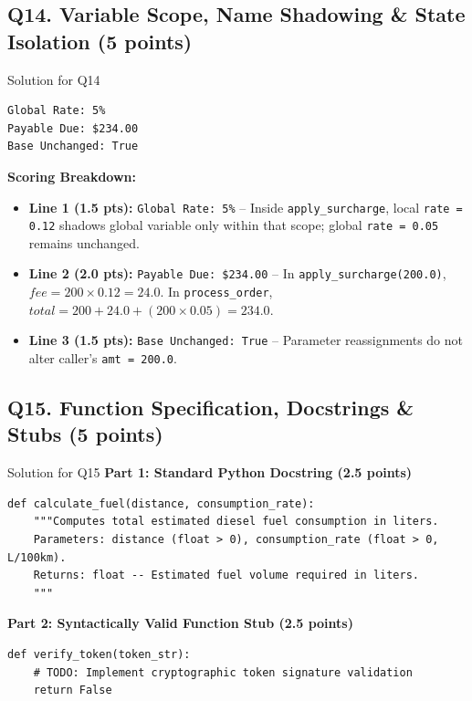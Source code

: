 \documentclass[11pt,a4paper]{article}
\begin{document}
\vspace{0.15cm}

\subsection*{Q14. Variable Scope, Name Shadowing \& State Isolation (5 points)}
\begin{solbox}{Solution for Q14}
\begin{lstlisting}
Global Rate: 5%
Payable Due: $234.00
Base Unchanged: True
\end{lstlisting}
\small
\textbf{Scoring Breakdown:}
\begin{itemize}[leftmargin=2em, itemsep=1pt]
  \item \textbf{Line 1 (1.5 pts):} \texttt{Global Rate: 5\%} -- Inside \texttt{apply\_surcharge}, local \texttt{rate = 0.12} shadows global variable only within that scope; global \texttt{rate = 0.05} remains unchanged.
  \item \textbf{Line 2 (2.0 pts):} \texttt{Payable Due: \$234.00} -- In \texttt{apply\_surcharge(200.0)}, $fee = 200 \times 0.12 = 24.0$. In \texttt{process\_order}, $total = 200 + 24.0 + (200 \times 0.05) = 234.0$.
  \item \textbf{Line 3 (1.5 pts):} \texttt{Base Unchanged: True} -- Parameter reassignments do not alter caller's \texttt{amt = 200.0}.
\end{itemize}
\end{solbox}

\vspace{0.15cm}

\subsection*{Q15. Function Specification, Docstrings \& Stubs (5 points)}
\begin{solbox}{Solution for Q15}
\small
\textbf{Part 1: Standard Python Docstring (2.5 points)}
\begin{lstlisting}
def calculate_fuel(distance, consumption_rate):
    """Computes total estimated diesel fuel consumption in liters.
    Parameters: distance (float > 0), consumption_rate (float > 0, L/100km).
    Returns: float -- Estimated fuel volume required in liters.
    """
\end{lstlisting}
\textbf{Part 2: Syntactically Valid Function Stub (2.5 points)}
\begin{lstlisting}
def verify_token(token_str):
    # TODO: Implement cryptographic token signature validation
    return False
\end{lstlisting}
\end{solbox}
\end{document}
